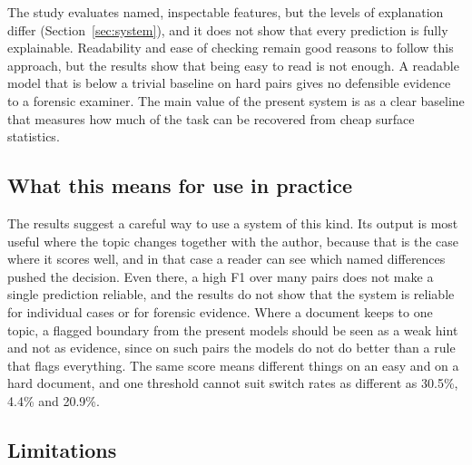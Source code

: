 \documentclass[runningheads]{llncs}
\begin{document}
The study evaluates named, inspectable features, but the levels of explanation differ (Section~\ref{sec:system}), and it does not show that every prediction is fully explainable. Readability and ease of checking remain good reasons to follow this approach, but the results show that being easy to read is not enough. A readable model that is below a trivial baseline on hard pairs gives no defensible evidence to a forensic examiner. The main value of the present system is as a clear baseline that measures how much of the task can be recovered from cheap surface statistics.

\subsection{What this means for use in practice}

The results suggest a careful way to use a system of this kind. Its output is most useful where the topic changes together with the author, because that is the case where it scores well, and in that case a reader can see which named differences pushed the decision. Even there, a high F1 over many pairs does not make a single prediction reliable, and the results do not show that the system is reliable for individual cases or for forensic evidence. Where a document keeps to one topic, a flagged boundary from the present models should be seen as a weak hint and not as evidence, since on such pairs the models do not do better than a rule that flags everything. The same score means different things on an easy and on a hard document, and one threshold cannot suit switch rates as different as 30.5\%, 4.4\% and 20.9\%.

\subsection{Limitations}
\end{document}
